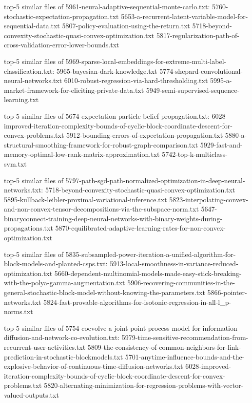 \documentclass[11pt]{article}
\begin{document}
top-5 similar files of 5961-neural-adaptive-sequential-monte-carlo.txt:
5760-stochastic-expectation-propagation.txt
5653-a-recurrent-latent-variable-model-for-sequential-data.txt
5807-policy-evaluation-using-the-return.txt
5718-beyond-convexity-stochastic-quasi-convex-optimization.txt
5817-regularization-path-of-cross-validation-error-lower-bounds.txt

top-5 similar files of
5969-sparse-local-embeddings-for-extreme-multi-label-classification.txt:
5965-bayesian-dark-knowledge.txt
5774-shepard-convolutional-neural-networks.txt
6010-robust-regression-via-hard-thresholding.txt
5995-a-market-framework-for-eliciting-private-data.txt
5949-semi-supervised-sequence-learning.txt

top-5 similar files of 5674-expectation-particle-belief-propagation.txt:
6028-improved-iteration-complexity-bounds-of-cyclic-block-coordinate-descent-for-convex-problems.txt
5912-bounding-errors-of-expectation-propagation.txt
5880-a-structural-smoothing-framework-for-robust-graph-comparison.txt
5929-fast-and-memory-optimal-low-rank-matrix-approximation.txt
5742-top-k-multiclass-svm.txt

top-5 similar files of
5797-path-sgd-path-normalized-optimization-in-deep-neural-networks.txt:
5718-beyond-convexity-stochastic-quasi-convex-optimization.txt
5895-kullback-leibler-proximal-variational-inference.txt
5823-interpolating-convex-and-non-convex-tensor-decompositions-via-the-subspace-norm.txt
5647-binaryconnect-training-deep-neural-networks-with-binary-weights-during-propagations.txt
5870-equilibrated-adaptive-learning-rates-for-non-convex-optimization.txt

top-5 similar files of
5835-subsampled-power-iteration-a-unified-algorithm-for-block-models-and-planted-csps.txt:
5913-local-smoothness-in-variance-reduced-optimization.txt
5660-dependent-multinomial-models-made-easy-stick-breaking-with-the-polya-gamma-augmentation.txt
5906-recovering-communities-in-the-general-stochastic-block-model-without-knowing-the-parameters.txt
5866-pointer-networks.txt
5824-fast-provable-algorithms-for-isotonic-regression-in-all-l\_p-norms.txt

top-5 similar files of
5754-coevolve-a-joint-point-process-model-for-information-diffusion-and-network-co-evolution.txt:
5979-time-sensitive-recommendation-from-recurrent-user-activities.txt
5809-the-consistency-of-common-neighbors-for-link-prediction-in-stochastic-blockmodels.txt
5701-anytime-influence-bounds-and-the-explosive-behavior-of-continuous-time-diffusion-networks.txt
6028-improved-iteration-complexity-bounds-of-cyclic-block-coordinate-descent-for-convex-problems.txt
5820-alternating-minimization-for-regression-problems-with-vector-valued-outputs.txt
\end{document}
